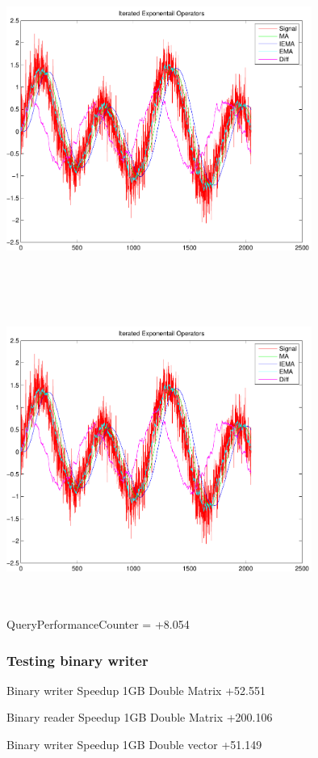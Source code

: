 \documentclass[9pt]{article}
\theoremstyle{plain}
\theoremstyle{definition}
\theoremstyle{remark}
\numberwithin{equation}{section}
\begin{document}
\includegraphics[width=10.0cm,height=10.0cm]{IteratedExponentailOperators.pdf}

\includegraphics[width=10.0cm,height=10.0cm]{IteratedExponentailOperators.pdf}

QueryPerformanceCounter  =  +8.054
\subsubsection{Testing binary writer}
Binary writer Speedup 1GB Double Matrix +52.551

Binary reader Speedup 1GB Double Matrix +200.106

Binary writer Speedup 1GB Double vector +51.149
\end{document}
